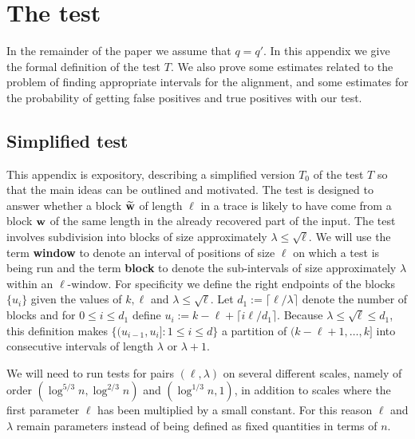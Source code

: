 \documentclass[final,12pt]{colt2018} %
\newcommand{\1}{\mathbf{1}}
\newcommand{\wt}{\widetilde}
\def\wtt{{\wt {\bf w}}}
\def\w{{\bf w}}
\begin{document}
\section{The test}
\label{sec:test2}

In the remainder of the paper we assume that $q = q'$.
In this appendix we give the formal definition of the test $T$.  We also
prove some estimates related to the problem of finding appropriate
intervals for the alignment, and some estimates for the probability
of getting false positives and true positives with our test.

\subsection{Simplified test} \label{ss:heuristic}

This appendix is expository, describing a simplified version $T_0$
of the test $T$ so that the main ideas can be outlined and motivated.
The test is designed to answer whether a block $\wtt$ of length $\ell$
in a trace is likely to have come from a block $\w$ of the same
length in the already recovered part of the input.  The test involves
subdivision into blocks of size approximately $\lambda \leq \sqrt{\ell}$.  We will
use the term {\bf window} to denote an interval of positions of
size $\ell$ on which a test is being run and the term {\bf block}
to denote the sub-intervals of size approximately $\lambda$ within an $\ell$-window.
For specificity we define the right endpoints of the blocks $\{ u_i \}$
given the values of $k, \ell$ and $\lambda \leq \sqrt{\ell}$.
Let $d_1 := \lceil \ell / \lambda \rceil$ denote the number of blocks and for $0 \leq i \leq d_1$
define $u_i := k - \ell + \lceil i \ell / d_1 \rceil$.  Because
$\lambda \leq \sqrt{\ell} \leq d_1$, this definition makes
$\{ (u_{i-1} , u_i] : 1 \leq i \leq d \}$
a partition of $(k - \ell + 1 , \ldots , k ]$
into consecutive intervals of length $\lambda$ or $\lambda + 1$.

We will need to run tests for pairs $(\ell , \lambda)$ on several
different scales, namely of order $(\log^{5/3} n , \log^{2/3} n)$ and $ (\log^{1/3} n , 1)$, in addition to scales where the first parameter $\ell$ has been multiplied by a small constant.
For this reason $\ell$ and $\lambda$ remain parameters instead
of being defined as fixed quantities in terms of $n$.
\end{document}
